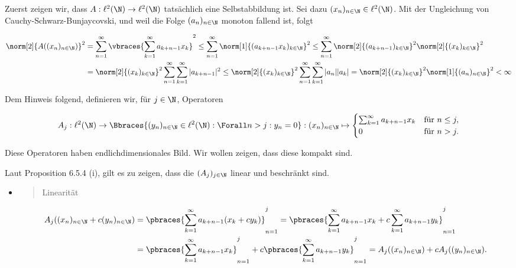 \begin{solution}

Zuerst zeigen wir, dass $A: \ell^2(\N) \to \ell^2(\N)$ tatsächlich eine Selbstabbildung ist.
Sei dazu $(x_n)_{n \in \N} \in \ell^2(\N)$.
Mit der Ungleichung von Cauchy-Schwarz-Bunjaycovski, und weil die Folge $(a_n)_{n \in \N}$ monoton fallend ist, folgt

\begin{align*}
  \norm[2]{A((x_n)_{n \in \N})}^2
  & =
  \sum_{n=1}^\infty
  \vbraces
  {
    \sum_{k=1}^\infty
    a_{k+n-1} x_k
  }^2
  \leq
  \sum_{n=1}^\infty
  \norm[1]{(a_{k+n-1} x_k)_{k \in \N}}^2
  \leq
  \sum_{n=1}^\infty
  \norm[2]{(a_{k+n-1})_{k \in \N}}^2
  \norm[2]{(x_k)_{k \in \N}}^2 \\
  & =
  \norm[2]{(x_k)_{k \in \N}}^2
  \sum_{n=1}^\infty
  \sum_{k=1}^\infty
  |a_{k+n-1}|^2
  \leq
  \norm[2]{(x_k)_{k \in \N}}^2
  \sum_{n=1}^\infty
  \sum_{k=1}^\infty
  |a_n| |a_k|
  =
  \norm[2]{(x_k)_{k \in \N}}^2
  \norm[1]{(a_n)_{n \in \N}}^2 < \infty
\end{align*}

Dem Hinweis folgend, definieren wir, für $j \in \N$, Operatoren

\begin{align*}
  A_j:
  \ell^2(\N)
  \to
  \Bbraces
  {
    (y_n)_{n \in \N} \in \ell^2(\N):
    \Forall n > j:
    y_n = 0
  }:
  (x_n)_{n \in \N}
  \mapsto
  \begin{cases}
    \sum_{k=1}^\infty
    a_{k+n-1} x_k
    &
    \text{für } n \leq j, \\
    0
    &
    \text{für } n > j.
  \end{cases}
\end{align*}

Diese Operatoren haben endlichdimensionales Bild.
Wir wollen zeigen, dass diese kompakt sind.


Laut Proposition 6.5.4 (i), gilt es zu zeigen, dass die $(A_j)_{j \in \N}$ linear und beschränkt sind.

\begin{itemize}

  \item
  \blockquote{Linearität}:

  \begin{align*}
    A_j((x_n)_{n \in \N} + c (y_n)_{n \in \N})
    & =
    \pbraces
    {
      \sum_{k=1}^\infty
      a_{k+n-1}
      (x_k + c y_k)
    }_{n=1}^j
    =
    \pbraces
    {
      \sum_{k=1}^\infty
      a_{k+n-1} x_k +
      c
      \sum_{k=1}^\infty
      a_{k+n-1} y_k
    }_{n=1}^j \\
    & =
    \pbraces
    {
      \sum_{k=1}^\infty
      a_{k+n-1} x_k
    }_{n=1}^j +
    c \pbraces
    {
      \sum_{k=1}^\infty
      a_{k+n-1} y_k
    }_{n=1}^j
    =
    A_j((x_n)_{n \in \N}) +
    c
    A_j((y_n)_{n \in \N}).
  \end{align*}


\end{itemize}
\end{solution}
